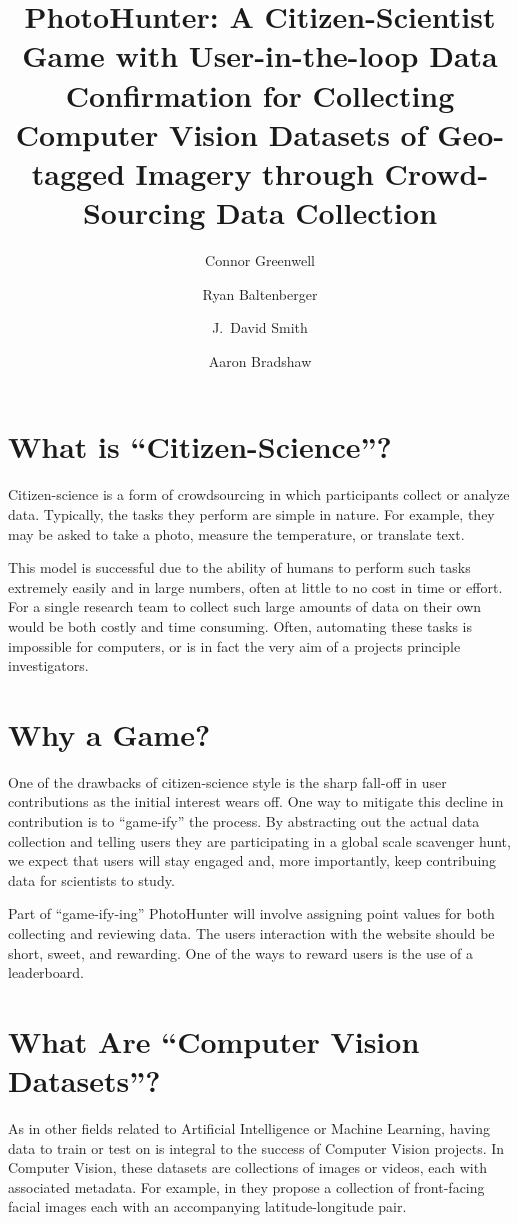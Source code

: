 \documentclass{article}
\title{PhotoHunter: A Citizen-Scientist Game with User-in-the-loop 
  Data Confirmation for Collecting Computer Vision Datasets of
Geo-tagged Imagery through Crowd-Sourcing Data Collection}
\author{Connor Greenwell \and Ryan Baltenberger 
  \and J.\ David Smith \and Aaron Bradshaw}
\begin{document}
\maketitle

\section{What is ``Citizen-Science''?}

Citizen-science is a form of crowdsourcing in which participants
collect or analyze data. Typically, the tasks they perform are simple
in nature. For example, they may be asked to take a photo, measure the 
temperature, or translate text.

This model is successful due to the ability of humans to perform such
tasks extremely easily and in large numbers, often at little to no
cost in time or effort. For a single research team to collect such
large amounts of data on their own would be both costly and time
consuming. Often, automating these tasks is impossible for computers,
or is in fact the very aim of a projects principle investigators.

\section{Why a Game?}

One of the drawbacks of citizen-science style is the sharp fall-off in
user contributions as the initial interest wears off. One way to
mitigate this decline in contribution is to ``game-ify'' the process.
By abstracting out the actual data collection and telling users they
are participating in a global scale scavenger hunt, we expect that
users will stay engaged and, more importantly, keep contribuing data
for scientists to study.

Part of ``game-ify-ing'' PhotoHunter will involve assigning point
values for both collecting and reviewing data. The users interaction
with the website should be short, sweet, and rewarding. One of the
ways to reward users is the use of a leaderboard.

\section{What Are ``Computer Vision Datasets''?}

As in other fields related to Artificial Intelligence or Machine
Learning, having data to train or test on is integral to the success
of Computer Vision projects. In Computer Vision, these datasets are 
collections of images or videos, each with
associated metadata. For example, in \cite{islam2014geofaces} they
propose a collection of front-facing facial images each with an
accompanying latitude-longitude pair. 
\end{document}
